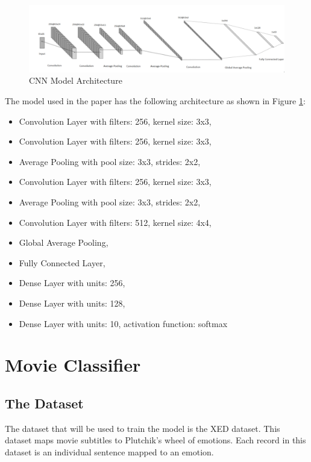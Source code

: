 \begin{figure}[H]
\centering
\includegraphics[width=\textwidth]{imgs/model_architecture.png}
\caption{CNN Model Architecture}
\label{fig: cnn architecture}
\end{figure}


The model used in the paper has the following architecture as shown in Figure \ref{fig: cnn architecture}:

\begin{itemize}
	\item Convolution Layer with filters: 256, kernel size: 3x3, 
	\item Convolution Layer with filters: 256, kernel size: 3x3, 
	\item Average Pooling with pool size: 3x3, strides: 2x2, 
	\item Convolution Layer with filters: 256, kernel size: 3x3,
	\item Average Pooling with pool size: 3x3, strides: 2x2, 
	\item Convolution Layer with filters: 512, kernel size: 4x4, 
	\item Global Average Pooling,
	\item Fully Connected Layer,
	\item Dense Layer with units: 256, 
	\item Dense Layer with units: 128, 
	\item Dense Layer with units: 10, activation function: softmax
\end{itemize}

\section{Movie Classifier}
\subsection{The Dataset}
The dataset that will be used to train the model is the XED dataset. This dataset maps movie subtitles to Plutchik's wheel of emotions. Each record in this dataset is an individual sentence mapped to an emotion. \newline

